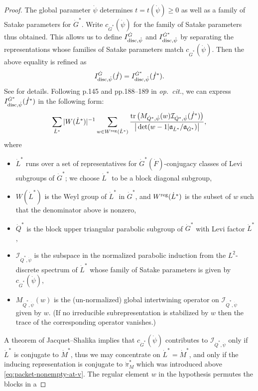 \documentclass[11pt,reqno]{amsart}
\theoremstyle{plain}
\theoremstyle{definition}
\newcommand{\fka}{{\mathfrak a}}
\newcommand{\cI}{\mathcal{I}}
\newcommand{\tr}{\tu{tr}\,}
\newcommand{\disc}{\tu{disc}}
\newcommand{\tu}{\textup}
\numberwithin{equation}{subsection}
\begin{document}
\begin{proof}
The global parameter $\dot \psi$ determines $t=t(\dot\psi)\ge 0$ as well as a family of Satake parameters for $\dot G^*$. Write $c_{\dot G^*}(\dot\psi)$ for the family of Satake parameters thus obtained. 
This allows us to define $I^{\dot G}_{\disc,\dot \psi}$ and $I^{\dot G^*}_{\disc,\dot \psi}$ by separating the representations whose families of Satake parameters match $c_{\dot G^*}(\dot\psi)$. Then the above equality is refined as
\begin{equation}\label{eq:I-disc-psi=I-disc-psi-*}
I^{\dot G}_{\disc,\dot \psi}(\dot f)=I^{\dot G^*}_{\disc,\dot \psi}(\dot f^*).
\end{equation}
See \cite[\S3.3]{Arthur} for details. Following p.145 and pp.188--189 in \emph{op.~cit.}, we can express $I^{\dot G^*}_{\disc,\dot \psi}(\dot f^*)$
in the following form:
\begin{equation}\label{eq:I-disc-psi}
    \sum_{\dot L^*} |W(\dot L^*)|^{-1} \sum_{w\in W^{\tu{reg}}(\dot L^*)} \frac{\tr\big(M_{\dot Q^*,\dot\psi}(w)\cI_{\dot Q^*,\dot\psi}(\dot f^*)\big)}{\big|\det(w-1| \fka_{\dot L^*}/\fka_{\dot G^*})\big|},
\end{equation}
where 
\begin{itemize}
    \item $\dot L^*$ runs over a set of representatives for $\dot G^*(\dot F)$-conjugacy classes of Levi subgroups of $\dot G^*$; we choose $\dot L^*$ to be a block diagonal subgroup,
    \item $W(\dot L^*)$ is the Weyl group of $\dot L^*$ in $\dot G^*$, and $W^{\tu{reg}}(\dot L^*)$ is the subset of $w$ such that the denominator above is nonzero,
    \item $\dot Q^*$ is the block upper triangular parabolic subgroup of $\dot G^*$ with Levi factor $\dot L^*$,
    \item $\cI_{\dot Q^*,\dot\psi}$ is the subspace in the normalized parabolic induction from the $L^2$-discrete spectrum of $\dot L^*$ whose family of Satake parameters is given by $c_{\dot G^*}(\dot\psi)$,
    \item $M_{\dot Q^*,\dot\psi}(w)$ is the (un-normalized) global intertwining operator on $\cI_{\dot Q^*,\dot\psi}$ given by $w$. (If no irreducible subrepresentation is stabilized by $w$ then the trace of the corresponding operator vanishes.)
\end{itemize}
A theorem of Jacquet--Shalika implies that $c_{\dot G^*}(\dot\psi)$ contributes to $\cI_{\dot Q^*,\dot\psi}$ only if $\dot L^*$ is conjugate to $\dot M^*$, thus we may concentrate on $\dot L^*=\dot M^*$, and only if the inducing representation is conjugate to $\dot \pi^*_M$ which was introduced above \eqref{eq:packet-nonempty-at-v}. The regular element $w$ in the hypothesis permutes the blocks in a

\end{proof}
\end{document}
